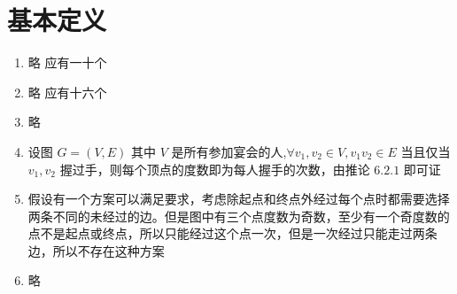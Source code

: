 \documentclass[../../main.tex]{subfiles}
\begin{document}
\section{基本定义}
\begin{enumerate}
    \item 略 应有一十个
    \item 略 应有十六个
    \item 略
    \item 设图 $G=(V,E)$ 其中 $V$ 是所有参加宴会的人,$\forall v_1,v_2 \in V, v_1v_2 \in E $ 当且仅当 $v_1,v_2$ 握过手，则每个顶点的度数即为每人握手的次数，由推论 $6.2.1$ 即可证
    \item 假设有一个方案可以满足要求，考虑除起点和终点外经过每个点时都需要选择两条不同的未经过的边。但是图中有三个点度数为奇数，至少有一个奇度数的点不是起点或终点，所以只能经过这个点一次，但是一次经过只能走过两条边，所以不存在这种方案
    \item 略
\end{enumerate}
\end{document}
